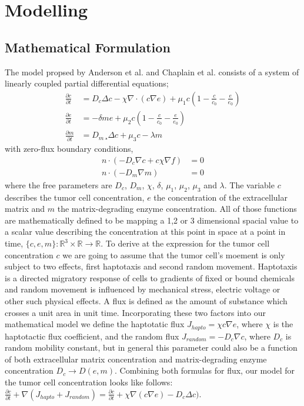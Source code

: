 \section{Modelling}

\subsection{Mathematical Formulation}

The model propsed by Anderson et al. \cite{anderson_continuous_1998,anderson_mathematical_2000} 
and Chaplain et al. \cite{anderson_continuous_1998,chaplain_mathematical_2006,chaplain_mathematical_2006-1,franssen_mathematical_2019} 
consists of a system of linearly coupled partial differential equations; 
\begin{align*}
	\frac{\partial c}{\partial t} &= D_c \Delta c - \chi \nabla \cdot (c\nabla e)  + \mu_1 c\left(1-\frac{c}{c_0}-\frac{e}{e_0}\right)
    \\
	\frac{\partial e}{\partial t} &= -\delta m e  + \mu_2 c\left(1-\frac{c}{c_0}-\frac{e}{e_0}\right)\\
	\frac{\partial m}{\partial t} &= D_m¸ \Delta c + \mu_3 c - \lambda m
\end{align*}
with zero-flux boundary conditions, 
\begin{align*}
	n\cdot (-D_c \nabla c + c \chi\nabla f) &= 0 \\
	n \cdot (-D_m\nabla m ) &= 0
\end{align*}
where the free parameters are $D_c$, $D_m$, $\chi$, $\delta$, $\mu_1$, $\mu_2$, $\mu_3$ and $\lambda$. \newline
The variable $c$ describes the tumor cell concentration, $e$ the concentration of the extracellular matrix and $m$ the matrix-degrading enzyme concentration. All of those functions are mathematically defined to be mapping a 1,2 or 3 dimensional spacial value to a scalar value describing the concentration at this point in space at a point in time, $\{c,e,m\} : \mathbb{R}^{3} \times \mathbb{R} \rightarrow \mathbb{R}$.\newline
To derive at the expression for the tumor cell concentration $c$ we are going to assume that the tumor cell's moement is only subject to two effects, first haptotaxis and second random movement. Haptotaxis is a directed migratory response of cells to gradients of fixed or bound chemicals \cite{anderson_continuous_1998} and random movement is influenced by mechanical stress, electric voltage or other such physical effects. A flux is defined as the amount of substance  which crosses a unit area in unit time. Incorporating these two factors into our mathematical model we define the haptotatic flux $J_{hapto} = \chi c \nabla e$, where $\chi$ is the haptotactic flux coefficient, and the random flux $J_{random} = -D_c \nabla c$, where $D_c$ is random mobility constant, but in general this parameter could also be a function of both extracellular matrix concentration and matrix-degrading enzyme concentration $D_c \rightarrow D(e,m)$. Combining both formulas for flux, our model for the tumor cell concentration looks like follows: $\frac{\partial c}{\partial t} + \nabla (J_{hapto} + J_{random}) = \frac{\partial c}{\partial t} + \chi \nabla (c \nabla e) - D_c \Delta c)$.\newline 
